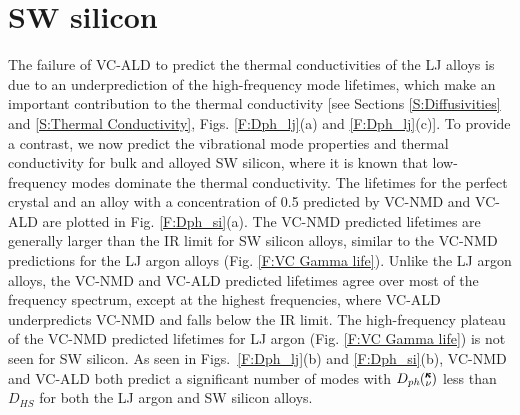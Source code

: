 \documentclass[aps,prb,onecolumn,preprint,footinbib,superscriptaddress,amsmath,amssymb,floatfix]{revtex4}
\newcommand{\kv}{\mspace{-4.0mu}\left(\mspace{-8.0mu}
\begin{smallmatrix}&\pmb{\kappa} \\&\nu\end{smallmatrix}
\mspace{-3.0mu}\right)}
\begin{document}

\clearpage

\section{\label{S:SW}SW silicon}

The failure of VC-ALD to predict the thermal conductivities of the LJ 
alloys is due to an underprediction of the high-frequency mode lifetimes, 
which make an important contribution to the thermal conductivity 
[see Sections \ref{S:Diffusivities} and \ref{S:Thermal Conductivity}, 
Figs. \ref{F:Dph_lj}(a) and \ref{F:Dph_lj}(c)]. To provide a contrast, 
we now predict the vibrational mode properties and thermal conductivity for bulk 
and alloyed SW silicon, where it is known that low-frequency modes 
dominate the thermal conductivity.
\cite{sellan_size_2010,sellan_cross-plane_2010} 
The lifetimes for the perfect crystal and an alloy with a concentration of 
0.5 predicted by VC-NMD and VC-ALD are plotted in Fig. \ref{F:Dph_si}(a). 
The VC-NMD predicted lifetimes are generally larger than 
the IR limit for SW silicon alloys, similar 
to the VC-NMD predictions for the LJ argon alloys 
(Fig. \ref{F:VC Gamma life}). Unlike the 
LJ argon alloys, the  
VC-NMD and VC-ALD predicted lifetimes agree over most 
of the frequency spectrum, except at the highest frequencies, where 
VC-ALD underpredicts VC-NMD and falls below the IR limit. 
The high-frequency plateau of the VC-NMD predicted lifetimes 
for LJ argon (Fig. \ref{F:VC Gamma life}) is not seen for SW silicon. 
As seen in Figs.~\ref{F:Dph_lj}(b) 
and \ref{F:Dph_si}(b), VC-NMD and VC-ALD both predict a significant 
number of modes with  
$D_{ph}\kv$ less than $D_{HS}$ for both the LJ argon and 
SW silicon alloys. 
\end{document}
